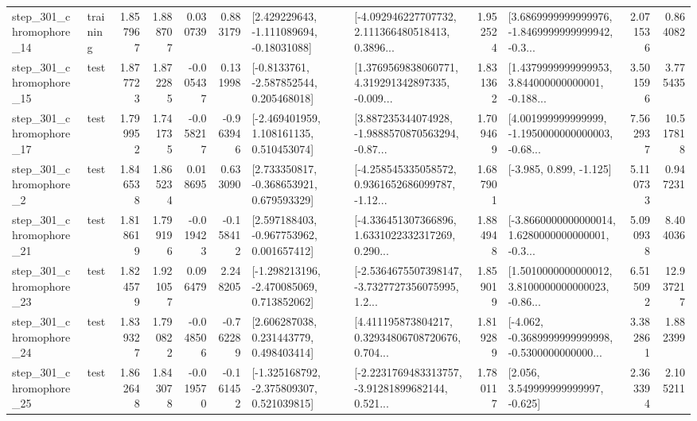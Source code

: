 \begin{tabular}{llrrrrllrlrr}
  step\_301\_chromophore\_14 &  training &      1.857967 &    1.888707 &      0.030739 &  0.883179 &    [2.429229643, -1.111089694, -0.18031088] &  [-4.092946227707732, 2.111366480518413, 0.3896... &       1.952524 &  [3.6869999999999976, -1.8469999999999942, -0.3... &            2.071536 &          0.864082 \\
  step\_301\_chromophore\_15 &      test &      1.877723 &    1.872285 &     -0.005437 &  0.131998 &     [-0.8133761, -2.587852544, 0.205468018] &  [1.3769569838060771, 4.319291342897335, -0.009... &       1.831362 &  [1.4379999999999953, 3.844000000000001, -0.188... &            3.501596 &          3.775435 \\
  step\_301\_chromophore\_17 &      test &      1.799952 &    1.741735 &     -0.058217 & -0.963946 &    [-2.469401959, 1.108161135, 0.510453074] &  [3.887235344074928, -1.9888570870563294, -0.87... &       1.709469 &  [4.001999999999999, -1.1950000000000003, -0.68... &            7.562937 &         10.517818 \\
   step\_301\_chromophore\_2 &      test &      1.846538 &    1.865234 &      0.018695 &  0.633090 &    [2.733350817, -0.368653921, 0.679593329] &  [-4.258545335058572, 0.9361652686099787, -1.12... &       1.687901 &                            [-3.985, 0.899, -1.125] &            5.110733 &          0.947231 \\
  step\_301\_chromophore\_21 &      test &      1.818619 &    1.799196 &     -0.019423 & -0.158412 &    [2.597188403, -0.967753962, 0.001657412] &  [-4.336451307366896, 1.6331022332317269, 0.290... &       1.884948 &  [-3.8660000000000014, 1.6280000000000001, -0.3... &            5.090938 &          8.404036 \\
  step\_301\_chromophore\_23 &      test &      1.824579 &    1.921057 &      0.096479 &  2.248205 &   [-1.298213196, -2.470085069, 0.713852062] &  [-2.5364675507398147, -3.7327727356075995, 1.2... &       1.859019 &  [1.5010000000000012, 3.8100000000000023, -0.86... &            6.515092 &         12.937217 \\
  step\_301\_chromophore\_24 &      test &      1.839327 &    1.790822 &     -0.048506 & -0.762289 &     [2.606287038, 0.231443779, 0.498403414] &  [4.411195873804217, 0.32934806708720676, 0.704... &       1.819289 &  [-4.062, -0.3689999999999998, -0.5300000000000... &            3.382861 &          1.882399 \\
  step\_301\_chromophore\_25 &      test &      1.862648 &    1.843078 &     -0.019570 & -0.161452 &   [-1.325168792, -2.375809307, 0.521039815] &  [-2.2231769483313757, -3.91281899682144, 0.521... &       1.780117 &                 [2.056, 3.549999999999997, -0.625] &            2.363394 &          2.105211 \\

\end{tabular}
